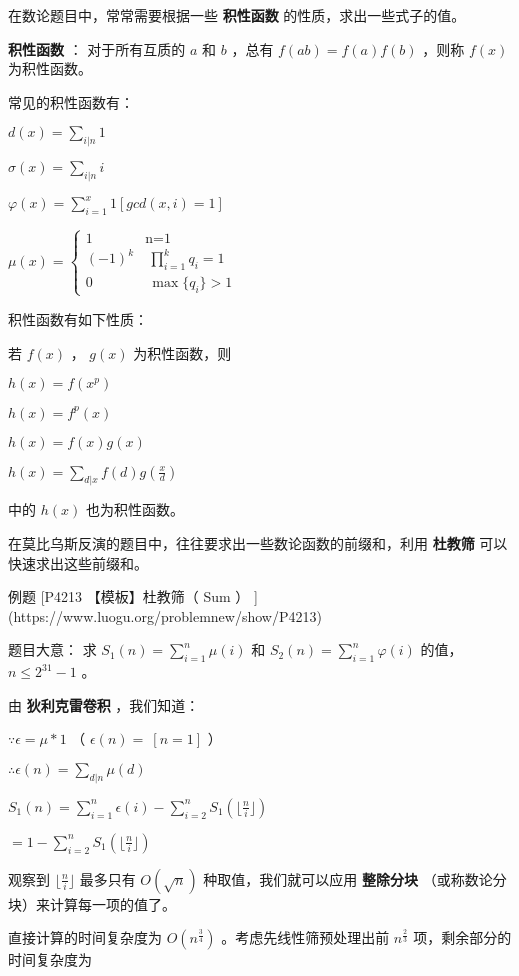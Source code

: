 
在数论题目中，常常需要根据一些 \textbf{ 积性函数 } 的性质，求出一些式子的值。

\textbf{ 积性函数 } ： 对于所有互质的 $a$ 和 $b$ ，总有 $f(ab)=f(a)f(b)$ ，则称 $f(x)$ 为积性函数。

常见的积性函数有：

$d(x)=\sum_{i|n} 1$

$\sigma(x)=\sum_{i|n} i$

$\varphi(x)=\sum_{i=1}^x 1[gcd(x,i)=1]$

$\mu(x)=\begin{cases}1&\text{n=1}\\(-1)^k& \ \prod_{i=1}^k q_i=1\\0 &\ \max\{q_i\}>1\end{cases}$

积性函数有如下性质：

若 $f(x)$ ， $g(x)$ 为积性函数，则

$h(x)=f(x^p)$ 

$h(x)=f^p(x)$

$h(x)=f(x)g(x)$

$h(x)=\sum_{d|x} f(d)g(\frac x d)$

中的 $h(x)$ 也为积性函数。

在莫比乌斯反演的题目中，往往要求出一些数论函数的前缀和，利用 \textbf{ 杜教筛 } 可以快速求出这些前缀和。 

\begin{NOTE}{ 例题 [P4213 【模板】杜教筛（ Sum ） ](https://www.luogu.org/problemnew/show/P4213)}{}

\end{NOTE}


题目大意： 求 $S_1(n)= \sum_{i=1}^n \mu(i)$ 和 $S_2(n)= \sum_{i=1}^n \varphi(i)$  的值， $n\le 2^{31} -1$ 。

由 \textbf{ 狄利克雷卷积 } ，我们知道：

$\because \epsilon =\mu * 1$ （ $\epsilon(n)=~[n=1]$ ） 

$\therefore \epsilon (n)=\sum_{d|n} \mu(d)$ 

$S_1(n)=\sum_{i=1}^n \epsilon (i)-\sum_{i=2}^n S_1(\lfloor \frac n i \rfloor)$

$= 1-\sum_{i=2}^n S_1(\lfloor \frac n i \rfloor)$

观察到 $\lfloor \frac n i \rfloor$ 最多只有 $O(\sqrt n)$ 种取值，我们就可以应用 \textbf{ 整除分块 } （或称数论分块）来计算每一项的值了。 

直接计算的时间复杂度为 $O(n^{\frac 3 4})$ 。考虑先线性筛预处理出前 $n^{\frac 2 3}$ 项，剩余部分的时间复杂度为

